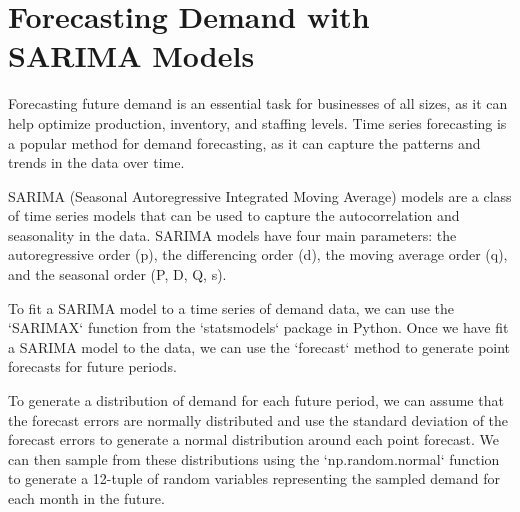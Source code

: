 


\section{Forecasting Demand with SARIMA Models}

Forecasting future demand is an essential task for businesses of all sizes, as it can help optimize production, inventory, and staffing levels. Time series forecasting is a popular method for demand forecasting, as it can capture the patterns and trends in the data over time.

SARIMA (Seasonal Autoregressive Integrated Moving Average) models are a class of time series models that can be used to capture the autocorrelation and seasonality in the data. SARIMA models have four main parameters: the autoregressive order (p), the differencing order (d), the moving average order (q), and the seasonal order (P, D, Q, s).

To fit a SARIMA model to a time series of demand data, we can use the `SARIMAX` function from the `statsmodels` package in Python. Once we have fit a SARIMA model to the data, we can use the `forecast` method to generate point forecasts for future periods. 

To generate a distribution of demand for each future period, we can assume that the forecast errors are normally distributed and use the standard deviation of the forecast errors to generate a normal distribution around each point forecast. We can then sample from these distributions using the `np.random.normal` function to generate a 12-tuple of random variables representing the sampled demand for each month in the future.

